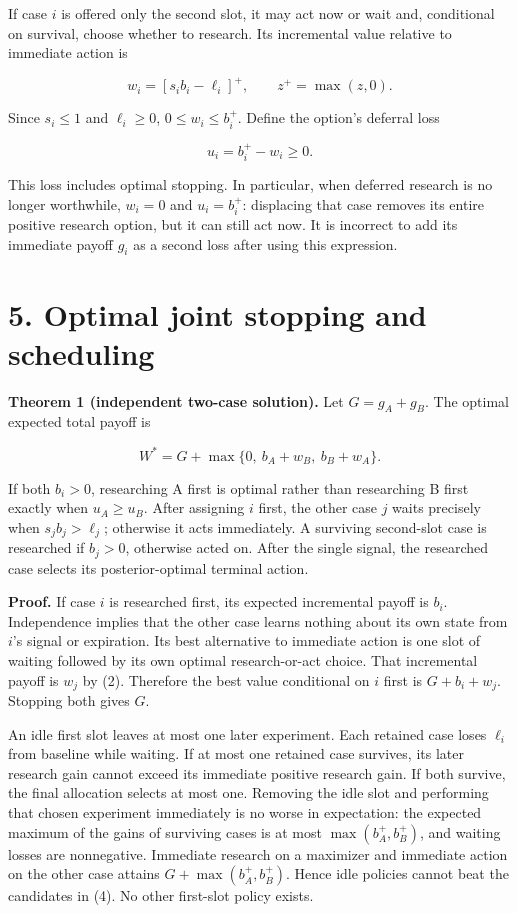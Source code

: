 \documentclass[
  11pt,
]{article}
\begin{document}
If case \(i\) is offered only the second slot, it may act now or wait
and, conditional on survival, choose whether to research. Its
incremental value relative to immediate action is

\[w_i=[s_ib_i-\ell_i]^+,\qquad z^+=\max(z,0). \tag{2}\]

Since \(s_i\leq1\) and \(\ell_i\geq0\), \(0\leq w_i\leq b_i^+\). Define
the option's deferral loss

\[u_i=b_i^+-w_i\geq0. \tag{3}\]

This loss includes optimal stopping. In particular, when deferred
research is no longer worthwhile, \(w_i=0\) and \(u_i=b_i^+\):
displacing that case removes its entire positive research option, but it
can still act now. It is incorrect to add its immediate payoff \(g_i\)
as a second loss after using this expression.

\section{5. Optimal joint stopping and
scheduling}\label{optimal-joint-stopping-and-scheduling}

\textbf{Theorem 1 (independent two-case solution).} Let \(G=g_A+g_B\).
The optimal expected total payoff is

\[W^*=G+\max\{0,\ b_A+w_B,\ b_B+w_A\}. \tag{4}\]

If both \(b_i>0\), researching A first is optimal rather than
researching B first exactly when \(u_A\geq u_B\). After assigning \(i\)
first, the other case \(j\) waits precisely when \(s_jb_j>\ell_j\);
otherwise it acts immediately. A surviving second-slot case is
researched if \(b_j>0\), otherwise acted on. After the single signal,
the researched case selects its posterior-optimal terminal action.

\textbf{Proof.} If case \(i\) is researched first, its expected
incremental payoff is \(b_i\). Independence implies that the other case
learns nothing about its own state from \(i\)'s signal or expiration.
Its best alternative to immediate action is one slot of waiting followed
by its own optimal research-or-act choice. That incremental payoff is
\(w_j\) by (2). Therefore the best value conditional on \(i\) first is
\(G+b_i+w_j\). Stopping both gives \(G\).

An idle first slot leaves at most one later experiment. Each retained
case loses \(\ell_i\) from baseline while waiting. If at most one
retained case survives, its later research gain cannot exceed its
immediate positive research gain. If both survive, the final allocation
selects at most one. Removing the idle slot and performing that chosen
experiment immediately is no worse in expectation: the expected maximum
of the gains of surviving cases is at most \(\max(b_A^+,b_B^+)\), and
waiting losses are nonnegative. Immediate research on a maximizer and
immediate action on the other case attains \(G+\max(b_A^+,b_B^+)\).
Hence idle policies cannot beat the candidates in (4). No other
first-slot policy exists.
\end{document}
